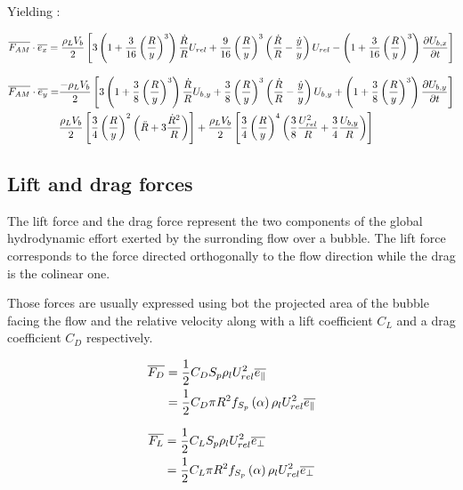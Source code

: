 Yielding :

\begin{align}
\overline{F_{AM}}\cdot \overline{e_{x}} = \frac{\rho_{L}V_{b}}{2}\left[ 3\left( 1+\frac{3}{16}\left( \frac{R}{y} \right)^{3}  \right) \frac{\dot{R}}{R}U_{rel} + \frac{9}{16}\left( \frac{R}{y} \right)^{3}\left( \frac{\dot{R}}{R}-\frac{\dot{y}}{y} \right)U_{rel} - \left( 1+\frac{3}{16}\left( \frac{R}{y} \right)^{3}  \right)\frac{\partial{U_{b,x}}}{\partial t} \right]
\end{align}



\begin{align}
\vect{F_{AM}}\cdot \vect{e_{y}} =& \frac{-\rho_{L}V_{b}}{2}\crocht{3\parth{1+\frac{3}{8}\parth{\frac{R}{y}}^{3} } \frac{\dot{R}}{R}U_{b,y} + \frac{3}{8}\parth{\frac{R}{y}}^{3}\parth{\frac{\dot{R}}{R}-\frac{\dot{y}}{y}}U_{b,y} + \parth{1+\frac{3}{8}\parth{\frac{R}{y}}^{3} }\dtime{U_{b,y}}}\\
%
&\frac{\rho_{L}V_{b}}{2}\crocht{\frac{3}{4} \parth{\frac{R}{y}}^{2}\parth{\ddot{R}+3\frac{\dot{R}^{2}}{R}} } + \frac{\rho_{L}V_{b}}{2} \crocht{\frac{3}{4}\parth{\frac{R}{y}}^{4}\parth{\frac{3}{8}\frac{U_{rel}^{2}}{R} + \frac{3}{4}\frac{U_{b,y}}{R}}}
\end{align}


\subsection{Lift and drag forces}

The lift force and the drag force represent the two components of the global hydrodynamic effort exerted by the surronding flow over a bubble. The lift force corresponds to the force directed orthogonally to the flow direction while the drag is the colinear one. 

\npar
Those forces are usually expressed using bot the projected area of the bubble facing the flow and the relative velocity along with a lift coefficient $C_{L}$ and a drag coefficient $C_{D}$ respectively.


\begin{align}
\overline{F_{D}}&=\frac{1}{2}C_{D}S_{p}\rho_{l}U_{rel}^{2}\overline{e_{\|}}\\
&=\frac{1}{2}C_{D}\pi R^{2}f_{S_{p}}\left( \alpha \right)\rho_{l}U_{rel}^{2}\overline{e_{\|}}
\end{align}


\begin{align}
\overline{F_{L}}&=\frac{1}{2}C_{L}S_{p}\rho_{l}U_{rel}^{2}\overline{e_{\bot}}\\
&=\frac{1}{2}C_{L}\pi R^{2}f_{S_{p}}\left( \alpha \right)\rho_{l}U_{rel}^{2}\overline{e_{\bot}}
\end{align}

